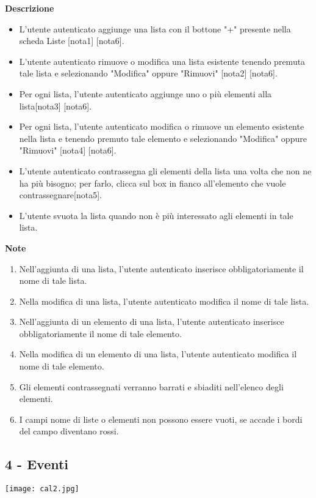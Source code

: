 \documentclass[a4paper,12pt]{article}
\begin{document}
\textbf{Descrizione}
\begin{itemize} \setlength\itemsep{0.01em}
\item L'utente autenticato aggiunge una lista con il bottone "+" presente nella scheda Liste [nota1] [nota6].
\item L'utente autenticato rimuove o modifica una lista esistente tenendo premuta tale lista e selezionando "Modifica" oppure "Rimuovi" [nota2] [nota6].
\item Per ogni lista, l'utente autenticato aggiunge uno o più elementi alla lista[nota3] [nota6].
\item Per ogni lista, l'utente autenticato modifica o rimuove un elemento esistente nella lista e tenendo premuto tale elemento e selezionando "Modifica" oppure "Rimuovi" [nota4] [nota6].
\item L'utente autenticato contrassegna gli elementi della lista una volta che non ne ha più bisogno; per farlo, clicca sul box in fianco all'elemento che vuole contrassegnare[nota5].
\item L'utente svuota la lista quando non è più interessato agli elementi in tale lista.
\end{itemize}

\textbf{Note}
\begin{enumerate} \setlength\itemsep{0.01em}
\item Nell'aggiunta di una lista, l'utente autenticato inserisce obbligatoriamente il nome di tale lista.
\item Nella modifica di una lista, l'utente autenticato modifica il nome di tale lista.
\item Nell'aggiunta di un elemento di una lista, l'utente autenticato inserisce obbligatoriamente il nome di tale elemento.
\item Nella modifica di un elemento di una lista, l'utente autenticato modifica il nome di tale elemento.
\item Gli elementi contrassegnati verranno barrati e sbiaditi nell'elenco degli elementi.
\item I campi nome di liste o elementi non possono essere vuoti, se accade i bordi del campo diventano rossi.
\end{enumerate}

\subsection*{4 - Eventi }

\begin{center}
  \texttt{[image: cal2.jpg]}
\end{center}
\end{document}
